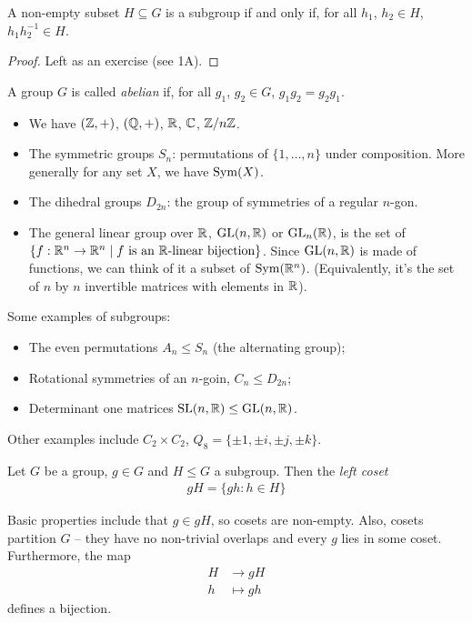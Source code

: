\documentclass{../../template/note}
\begin{document}
    \begin{proposition}
        A non-empty subset $H \subseteq G$ is a subgroup if and only if, for all $h_1$, $h_2 \in H$, $h_1h_2^{-1} \in H$.
    \end{proposition}
    
    \begin{proof}
        Left as an exercise (see 1A).
    \end{proof}
    
    \begin{definition}
        A group $G$ is called \emph{abelian} if, for all $g_1$, $g_2 \in G$, $g_1g_2 = g_2g_1$.
    \end{definition}
    
    \begin{example}
        \begin{itemize}
            \item We have $(\mathbb Z, +)$, $(\mathbb Q, +)$, $\mathbb R$, $\mathbb C$, $\mathbb Z/n\mathbb Z$.
            \item The symmetric groups $S_n$: permutations of $\{1, \dots, n\}$ under composition. More generally for any set $X$, we have $\operatorname{Sym}(X)$.
            \item The dihedral groups $D_{2n}$: the group of symmetries of a regular $n$-gon.
            \item The general linear group over $\mathbb R$, $\operatorname{GL}(n, \mathbb R)$ or $\operatorname{GL}_n(\mathbb R)$, is the set of $\{f: \mathbb R^n \to \mathbb R^n \mid f \text{ is an }\mathbb R\text{-linear bijection}\}$. Since $\operatorname{GL}(n, \mathbb R)$ is made of functions, we can think of it a subset of $\operatorname{Sym}(\mathbb R^n)$. (Equivalently, it's the set of $n$ by $n$ invertible matrices with elements in $\mathbb R$).
        \end{itemize}
        Some examples of subgroups:
        \begin{itemize}
            \item The even permutations $A_n \leq S_n$ (the alternating group);
            \item Rotational symmetries of an $n$-goin, $C_n \leq D_{2n}$;
            \item Determinant one matrices $\operatorname{SL}(n, \mathbb R) \leq \operatorname{GL}(n, \mathbb R)$.
        \end{itemize}
        Other examples include $C_2 \times C_2$, $Q_8 = \{\pm 1, \pm i, \pm j, \pm k\}$.        
    \end{example}
    
    \begin{definition}
        Let $G$ be a group, $g \in G$ and $H \leq G$ a subgroup. Then the \emph{left coset}
        \begin{align*}
            gH = \{gh: h \in H\}
        \end{align*}
    \end{definition}
    Basic properties include that $g \in gH$, so cosets are non-empty. Also, cosets partition $G$ -- they have no non-trivial overlaps and every $g$ lies in some coset. Furthermore, the map
    \begin{align*}
        H &\to gH \\
        h &\mapsto gh
    \end{align*}
    defines a bijection.
    
\end{document}
